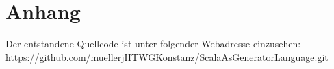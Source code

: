 \documentclass[11pt,a4paper]{report}
\begin{document}




\listoffigures
\cleardoublepage
{}
\lstlistoflistings
\tableofcontents
\newpage
{}
\setcounter{page}{1}





\chapter*{Anhang}
Der entstandene Quellcode ist unter folgender Webadresse einzusehen:\\\url{https://github.com/muellerjHTWGKonstanz/ScalaAsGeneratorLanguage.git}


\nocite{*}

\end{document}
